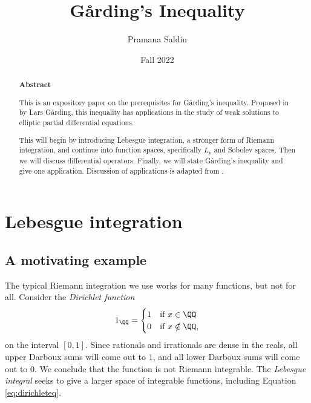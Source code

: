 \documentclass{scrartcl}
\title{G\r{a}rding's Inequality}
\author{Pramana Saldin}
\date{Fall 2022}
\begin{document}

\maketitle

\begin{abstract}
    \begin{center}
        \textbf{Abstract}
    \end{center}
    This is an expository paper on the prerequisites for 
    G\r{a}rding's inequality. Proposed in \cite{original-garding} by Lars G\r{a}rding, this inequality has applications in the study of weak solutions to elliptic partial differential equations. 
    
    This will begin by introducing Lebesgue integration, a stronger form 
    of Riemann integration, and continue into function spaces, specifically $L_p$ and Sobolev spaces. Then we will discuss differential operators. Finally, we will state G\r{a}rding's inequality and give one application. 
    Discussion of applications is adapted from 
    \cite{renardy2004introduction}.
\end{abstract}
\tableofcontents
\restoregeometry

\section{Lebesgue integration}

\subsection{A motivating example}

The typical Riemann integration we use works for many functions, but
not for all. Consider the \textit{Dirichlet function} 
\begin{equation}
    \label{eq:dirichleteq}
    1_\QQ = \begin{cases}
        1 &\text{if } x\in \QQ \\
        0 &\text{if } x\notin \QQ,
    \end{cases}
\end{equation}
on the interval $[0,1]$.
Since rationals and irrationals are dense in 
the reals, all upper Darboux sums will come out to $1$, and 
all lower Darboux sums will come out to $0$. We conclude that 
the function is not Riemann integrable. The \textit{Lebesgue integral} 
seeks to give a larger space of integrable functions, 
including Equation \ref{eq:dirichleteq}.
\end{document}
